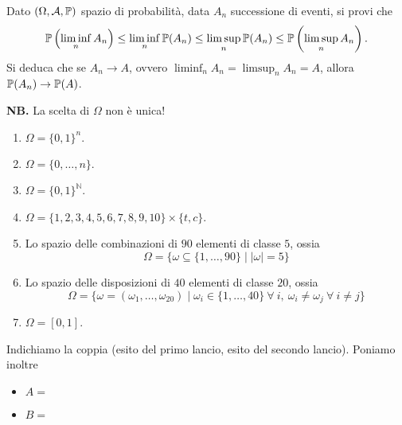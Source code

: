 \Esercizio{$\star$}

Dato $(\Omega ,\mathcal{A} ,\mathbb{P})$ spazio di probabilità, data $A_{n}$ successione di eventi, si provi che
\begin{equation*}
	\mathbb{P}\left(\liminf _{n} A_{n}\right) \leq \liminf _{n}\mathbb{P}(A_{n}) \leq \limsup _{n}\mathbb{P}(A_{n})\leq \mathbb{P}\left(\limsup _{n} A_{n}\right) .
\end{equation*}
Si deduca che se $A_{n}\rightarrow A$, ovvero $\liminf_{n} A_{n} =\limsup _{n} A_{n} =A$, allora $\mathbb{P}(A_{n})\rightarrow \mathbb{P}(A)$.

\ParteSoluzioni

\Soluzione


\textbf{NB.} La scelta di $\Omega $ non è unica!
\begin{enumerate}
	\item $\Omega =\{0,1\}^{n} .$
	\item $\Omega =\{0,\dots ,n\}$.
	\item $\Omega =\{0,1\}^{\mathbb{N}}$.
	\item $\Omega =\{1,2,3,4,5,6,7,8,9,10\} \times \{t,c\}$.
	\item Lo spazio delle combinazioni di $90$ elementi di classe $5$, ossia
	\begin{equation*}
		\Omega =\{\omega \subseteq \{1,\dots ,90\} \mid |\omega |=5\}
	\end{equation*}
	\item Lo spazio delle disposizioni di $40$ elementi di classe $20$, ossia
	\begin{equation*}
		\Omega =\{\omega =(\omega _{1} ,\dots ,\omega _{20}) \mid \omega _{i} \in \{1,\dots ,40\} \ \forall \ i,\ \omega _{i} \neq \omega _{j} \ \forall \ i\neq j\}
	\end{equation*}
	\item $\Omega =[0,1]$.
\end{enumerate}

\Soluzione

Indichiamo la coppia (esito del primo lancio, esito del secondo lancio). Poniamo inoltre
\begin{itemize}
	\item $A=$ 
	\item $B=$ 
\end{itemize}

